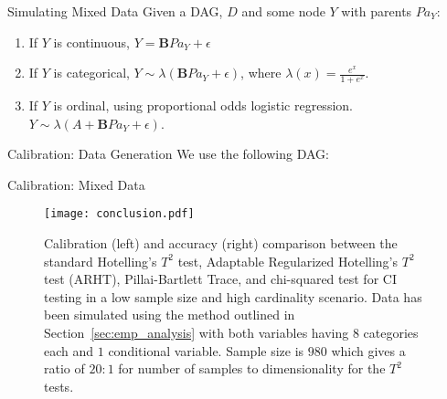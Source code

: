 \documentclass{beamer}
\begin{document}
\begin{frame}{Simulating Mixed Data}
	Given a DAG, $ D $ and some node $ Y $ with parents $ Pa_Y $:
	\begin{enumerate}
		\item If $ Y $ is continuous, $ Y = \mathbf{B} Pa_Y + \epsilon $
		\item If $ Y $ is categorical, $ Y \sim \lambda(\mathbf{B} Pa_Y + \epsilon) $, where $ \lambda(x) = \frac{e^x}{1+e^x} $.
		\item If $ Y $ is ordinal, using proportional odds logistic regression. $ Y \sim \lambda(A + \mathbf{B} Pa_Y + \epsilon) $.
	\end{enumerate}
\end{frame}

\begin{frame}{Calibration: Data Generation}
	We use the following DAG:
\begin{center}
\end{center}

\end{frame}

\begin{frame}{Calibration: Mixed Data}
	\begin{figure}[t]
		\centering
		\texttt{[image: conclusion.pdf]}
		\caption{Calibration (left) and accuracy (right) comparison between the
		standard Hotelling's $ T^2 $ test, Adaptable Regularized Hotelling's $
		T^2 $ test (ARHT), Pillai-Bartlett Trace, and chi-squared test for CI
		testing in a low sample size and high cardinality scenario. Data has
		been simulated using the method outlined in
		Section~\ref{sec:emp_analysis} with both variables having $ 8 $
		categories each and $ 1 $ conditional variable. Sample size is $ 980 $
		which gives a ratio of $ 20:1 $ for number of samples to dimensionality
		for the $T^2$ tests.}
		\label{fig:conc_compare}
	\end{figure}
\end{frame}
\end{document}
